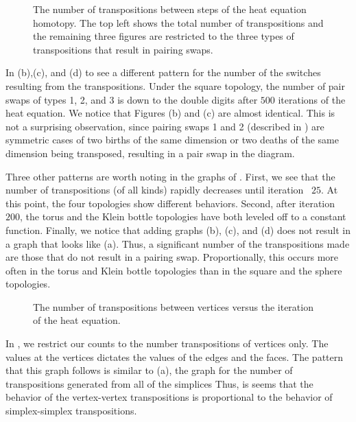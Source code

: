 \begin{figure}[hbt]
	\centering
 \caption{The number of transpositions between steps of the heat equation
          homotopy.  The top left shows the total number of transpositions and
          the remaining three figures are restricted to the three types of
          transpositions that result in pairing swaps.}
 \label{fig:numTrans}
\end{figure}
In  (b),(c), and (d) to see a different pattern for 
the number of the switches resulting from the transpositions.
Under the square topology, the number of pair swaps of types 1,
2, and 3 is down to the double digits after $500$ iterations of the heat 
equation.
We notice that Figures (b) and (c) are almost identical.  This is not a 
surprising observation, since pairing swaps 1 and 2 (described in 
) are symmetric cases of two births of the same dimension
or two deaths of the same dimension being transposed, resulting in a pair swap
in the diagram.

Three other patterns are worth noting in the graphs of .  
First, we see that
the number of transpositions (of all kinds) rapidly decreases until 
iteration ~$25$.  At this point, the four topologies show different behaviors.
Second, after iteration ~$200$, the torus and the Klein bottle topologies have
both leveled off to a constant function.
Finally, we notice that adding graphs (b), (c), and (d) does not result
in a graph that looks like (a).  Thus, a significant number of the
transpositions made are those that do not result in a pairing swap.
Proportionally, this occurs more often in the torus and Klein bottle topologies
than in the square and the sphere topologies.

\begin{figure}[hbt]
 \vspace*{0.1in}
 \centering
 \centerline{}
 \caption{The number of transpositions between vertices versus the iteration
          of the heat equation.}
 \label{fig:vertexTranspositions}
\end{figure}
In , we restrict our counts to the number 
transpositions of vertices only.  The
values at the vertices dictates the values of the edges and the faces.  The
pattern that this graph follows is similar to 
(a), the graph for the number of transpositions 
generated from all of the simplices  Thus, is seems that the behavior of the vertex-vertex 
transpositions is proportional to the behavior of simplex-simplex 
transpositions.
